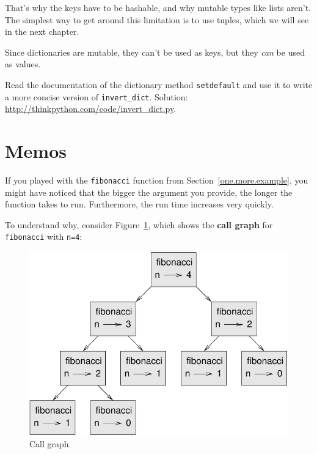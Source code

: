 \documentclass[10pt]{book}
\begin{document}
That's why the keys have to be hashable, and why mutable types like
lists aren't.  The simplest way to get around this limitation is to
use tuples, which we will see in the next chapter.

Since dictionaries are mutable, they can't be used as keys,
but they {\em can} be used as values.

\begin{exercise}
Read the documentation of the dictionary method {\tt setdefault}
and use it to write a more concise version of \verb"invert_dict".
Solution: \url{http://thinkpython.com/code/invert_dict.py}.

\end{exercise}


\section{Memos}

If you played with the {\tt fibonacci} function from
Section~\ref{one.more.example}, you might have noticed that the bigger
the argument you provide, the longer the function takes to run.
Furthermore, the run time increases very quickly.

To understand why, consider Figure~\ref{fig.fibonacci}, which shows
the {\bf call graph} for {\tt fibonacci} with {\tt n=4}:

\begin{figure}
\centerline
{\includegraphics[scale=0.7]{figs/fibonacci.pdf}}
\caption{Call graph.}
\label{fig.fibonacci}
\end{figure}
\end{document}
